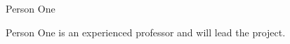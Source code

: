 \begin{participant}[type=PI,PM=12,gender=female,salary=5500]{Person One}

  Person One is an experienced professor and will lead the project.

\end{participant}

